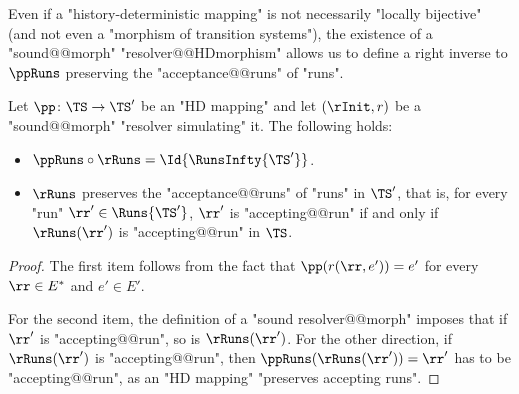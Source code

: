 \documentclass{theoretics}
\begin{document}
Even if a "history-deterministic mapping" is not necessarily "locally bijective" (and not even a "morphism of transition systems"), the existence of a "sound@@morph" "resolver@@HDmorphism" allows us to define a right inverse to $\ppRuns$ preserving the "acceptance@@runs" of "runs". 

\begin{lemma}\label{lemma-morph:facts_HD_morphisms}
	Let $\pp\colon \TS \to \TS'$ be an "HD mapping" and let $(\rInit, r)$ be a "sound@@morph" "resolver simulating" it. The following holds:
	\begin{itemize}
		\item $\ppRuns \circ \rRuns = \Id{\RunsInfty{\TS'}}$.
		\item $\rRuns$ preserves the "acceptance@@runs" of "runs" in $\TS'$, that is,  for every "run" $\rr' \in \Runs{\TS'}$,  $\rr'$ is "accepting@@run" if and only if $\rRuns(\rr')$ is "accepting@@run" in $\TS$.
	\end{itemize}
\end{lemma}
\begin{proof}
	The first item follows from the fact that $\pp(r(\rr,e')) = e'$ for every $\rr\in E^*$ and $e'\in E'$. 
	
	For the second item, the definition of a "sound resolver@@morph" imposes that if $\rr'$ is "accepting@@run", so is $\rRuns(\rr')$. For the other direction, if $\rRuns(\rr')$ is "accepting@@run", then $\ppRuns(\rRuns(\rr')) = \rr'$ has to be "accepting@@run", as an "HD mapping" "preserves accepting runs".
\end{proof}
\end{document}
